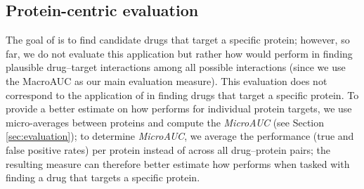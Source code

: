 \documentclass{bioinfo}
\begin{document}
\subsection{Protein-centric evaluation}
The goal of \name{} is to find candidate drugs that target a specific
protein; however, so far, we do not evaluate this application but
rather how \name{} would perform in finding plausible drug--target
interactions among all possible interactions (since we use the
MacroAUC as our main evaluation measure). This evaluation does not
correspond to the application of \name{} in finding drugs that target a
specific protein.  To provide a better estimate on how \name{} performs
for individual protein targets, we use micro-averages between proteins
and compute the \textit{MicroAUC} (see Section \ref{sec:evaluation});
to determine {\em MicroAUC}, we average the performance (true and
false positive rates) per protein instead of across all drug--protein
pairs; the resulting measure can therefore better estimate how \name{}
performs when tasked with finding a drug that targets a specific
protein.

\end{document}
